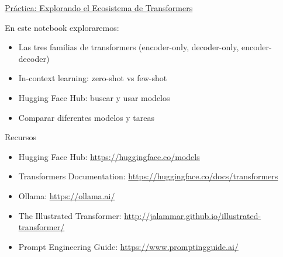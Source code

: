 \begin{exercise}
\href{https://colab.research.google.com/}{Práctica: Explorando el Ecosistema de Transformers}

En este notebook exploraremos:
\begin{itemize}
    \item Las tres familias de transformers (encoder-only, decoder-only, encoder-decoder)
    \item In-context learning: zero-shot vs few-shot
    \item Hugging Face Hub: buscar y usar modelos
    \item Comparar diferentes modelos y tareas
\end{itemize}
\end{exercise}


\begin{frame}{Recursos}
\begin{itemize}
    \item Hugging Face Hub: \url{https://huggingface.co/models}
    \item Transformers Documentation: \url{https://huggingface.co/docs/transformers}
    \item Ollama: \url{https://ollama.ai/}
    \item The Illustrated Transformer: \url{http://jalammar.github.io/illustrated-transformer/}
    \item Prompt Engineering Guide: \url{https://www.promptingguide.ai/}
\end{itemize}
\end{frame}


